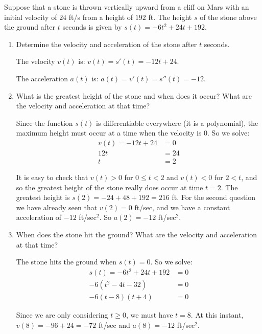 \documentclass[nooutcomes]{ximera}
\begin{document}
\begin{problem}
Suppose that a stone is thrown vertically upward from a cliff on Mars with an initial velocity of $24$ ft/s from a height of $192$ ft.  The height $s$ of the stone above the ground after $t$ seconds is given by $s(t) = -6t^2 + 24t + 192$.

	\begin{enumerate}
	
	\item  Determine the velocity and acceleration of the stone after $t$ seconds.
			\begin{freeResponse}
			The velocity $v(t)$ is:  $v(t) = s'(t) = -12t + 24$.
			
			The acceleration $a(t)$ is:  $a(t) = v'(t) = s''(t) = -12$.
			\end{freeResponse}
			
			
			
	\item  What is the greatest height of the stone and when does it occur?  What are the velocity and acceleration at that time?
			\begin{freeResponse}
			Since the function $s(t)$ is differentiable everywhere (it is a polynomial), the maximum height must occur at a time when the velocity is $0$.  So we solve:
			\begin{align*}
			v(t) = -12t+24 &= 0 \\
			12t &= 24 \\
			t &= 2
			\end{align*}
			
			It is easy to check that $v(t) > 0$ for $0 \leq t < 2$ and $v(t) < 0$ for $2 < t$, and so the greatest height of the stone really does occur at time $t=2$.  The greatest height is $s(2) = -24 + 48 + 192 = 216$ ft.  For the second question we have already seen that $v(2) = 0$ ft/sec, and we have a constant acceleration of $-12$ ft/sec$^2$.  So $a(2) = -12$ ft/sec$^2$.
			\end{freeResponse}
			
			
			
	\item  When does the stone hit the ground?  What are the velocity and acceleration at that time?
			\begin{freeResponse}
			The stone hits the ground when $s(t) = 0$.  So we solve:
			\begin{align*}
			s(t) = -6t^2 + 24t + 192 &= 0 \\
			-6(t^2 - 4t - 32) &= 0 \\
			-6(t-8)(t+4) &= 0 
			\end{align*}
			
			Since we are only considering $t \geq 0$, we must have $t=8$.  At this instant, $v(8) = -96 + 24 = -72$ ft/sec and $a(8) = -12$ ft/sec$^2$.  
			
			\end{freeResponse}
			
			
			
	\end{enumerate}
			
			
			
		
\end{problem}
\end{document}
